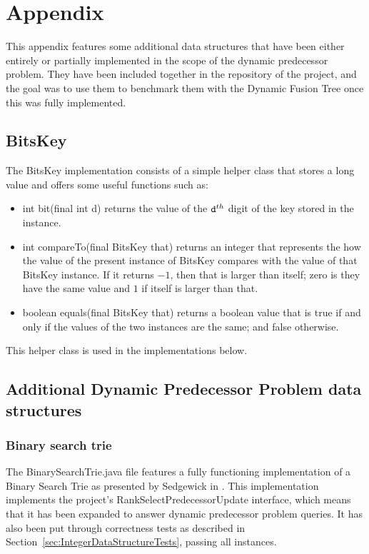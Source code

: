 
\chapter{Appendix}

This appendix features some additional data structures that have been either entirely or partially implemented in the scope of the dynamic predecessor problem. They have been included together in the repository of the project, and the goal was to use them to benchmark them with the Dynamic Fusion Tree once this was fully implemented.

\section{{\ttfamily BitsKey}}

The {\ttfamily BitsKey} implementation consists of a simple helper class that stores a {\ttfamily long} value and offers some useful functions such as:
\begin{itemize}
    \item
    {\ttfamily int bit(final int d)} returns the value of the $\text{{\ttfamily d}}^{th}$ digit of the key stored in the instance.
    
    \item
    {\ttfamily int compareTo(final BitsKey that)} returns an integer that represents the how the value of the present instance of {\ttfamily BitsKey} compares with the value of {\ttfamily that BitsKey} instance. If it returns $-1$, then {\ttfamily that} is larger than itself; zero is they have the same value and $1$ if itself is larger than {\ttfamily that}.
    
    \item
    {\ttfamily boolean equals(final BitsKey that)} returns a {\ttfamily boolean} value that is {\ttfamily true} if and only if the values of the two instances are the same; and {\ttfamily false} otherwise.
\end{itemize}

This helper class is used in the implementations below.

\section{Additional Dynamic Predecessor Problem data structures}

\subsection{Binary search trie}
The {\ttfamily BinarySearchTrie.java} file features a fully functioning implementation of a Binary Search Trie as presented by Sedgewick in \cite{sedgewick2002algorithms}. This implementation implements the project's {\ttfamily RankSelectPredecessorUpdate} interface, which means that it has been expanded to answer dynamic predecessor problem queries. It has also been put through correctness tests as described in Section~\ref{sec:IntegerDataStructureTests}, passing all instances.

